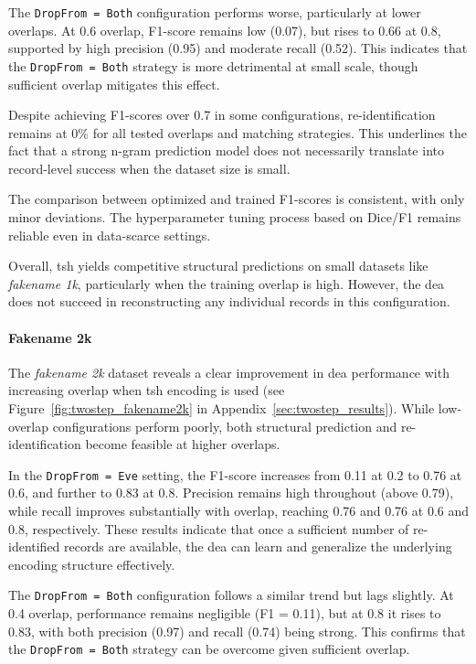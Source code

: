 The \texttt{DropFrom = Both} configuration performs worse, particularly at lower overlaps.
At 0.6 overlap, F1-score remains low (0.07), but rises to 0.66 at 0.8, supported by high precision (0.95) and moderate recall (0.52).
This indicates that the \texttt{DropFrom = Both} strategy is more detrimental at small scale, though sufficient overlap mitigates this effect.

Despite achieving F1-scores over 0.7 in some configurations, re-identification remains at 0\% for all tested overlaps and matching strategies.
This underlines the fact that a strong n-gram prediction model does not necessarily translate into record-level success when the dataset size is small.

The comparison between optimized and trained F1-scores is consistent, with only minor deviations.
The hyperparameter tuning process based on Dice/F1 remains reliable even in data-scarce settings.

Overall, \ac{tsh} yields competitive structural predictions on small datasets like \textit{fakename 1k}, particularly when the training overlap is high.
However, the \ac{dea} does not succeed in reconstructing any individual records in this configuration.



\paragraph{Fakename 2k}

The \textit{fakename 2k} dataset reveals a clear improvement in \ac{dea} performance with increasing overlap when \ac{tsh} encoding is used (see Figure~\ref{fig:twostep_fakename2k} in Appendix~\ref{sec:twostep_results}).
While low-overlap configurations perform poorly, both structural prediction and re-identification become feasible at higher overlaps.

In the \texttt{DropFrom = Eve} setting, the F1-score increases from 0.11 at 0.2 to 0.76 at 0.6, and further to 0.83 at 0.8.
Precision remains high throughout (above 0.79), while recall improves substantially with overlap, reaching 0.76 and 0.76 at 0.6 and 0.8, respectively.
These results indicate that once a sufficient number of re-identified records are available, the \ac{dea} can learn and generalize the underlying encoding structure effectively.

The \texttt{DropFrom = Both} configuration follows a similar trend but lags slightly.
At 0.4 overlap, performance remains negligible (F1 = 0.11), but at 0.8 it rises to 0.83, with both precision (0.97) and recall (0.74) being strong.
This confirms that the \texttt{DropFrom = Both} strategy can be overcome given sufficient overlap.


